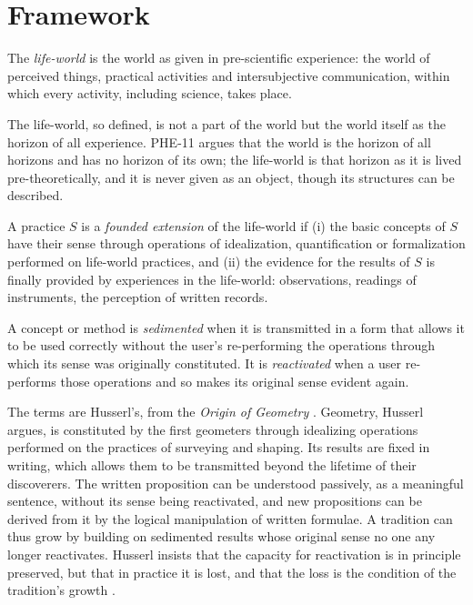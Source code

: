 \documentclass{situationist-preprint}
\begin{document}
\section{Framework}\label{s:framework}

\begin{definition}\label{d:lifeworld}
The \emph{life-world} is the world as given in pre-scientific experience: the world of perceived things, practical activities and intersubjective communication, within which every activity, including science, takes place.
\end{definition}

The life-world, so defined, is not a part of the world but the world itself as the horizon of all experience. PHE-11 argues that the world is the horizon of all horizons and has no horizon of its own; the life-world is that horizon as it is lived pre-theoretically, and it is never given as an object, though its structures can be described.

\begin{definition}\label{d:founded}
A practice $S$ is a \emph{founded extension} of the life-world if (i) the basic concepts of $S$ have their sense through operations of idealization, quantification or formalization performed on life-world practices, and (ii) the evidence for the results of $S$ is finally provided by experiences in the life-world: observations, readings of instruments, the perception of written records.
\end{definition}

\begin{definition}\label{d:sedimentation}
A concept or method is \emph{sedimented} when it is transmitted in a form that allows it to be used correctly without the user's re-performing the operations through which its sense was originally constituted. It is \emph{reactivated} when a user re-performs those operations and so makes its original sense evident again.
\end{definition}

The terms are Husserl's, from the \emph{Origin of Geometry} \citep{Husserl1939b}. Geometry, Husserl argues, is constituted by the first geometers through idealizing operations performed on the practices of surveying and shaping. Its results are fixed in writing, which allows them to be transmitted beyond the lifetime of their discoverers. The written proposition can be understood passively, as a meaningful sentence, without its sense being reactivated, and new propositions can be derived from it by the logical manipulation of written formulae. A tradition can thus grow by building on sedimented results whose original sense no one any longer reactivates. Husserl insists that the capacity for reactivation is in principle preserved, but that in practice it is lost, and that the loss is the condition of the tradition's growth \citep[see also][]{Derrida1962}.
\end{document}
